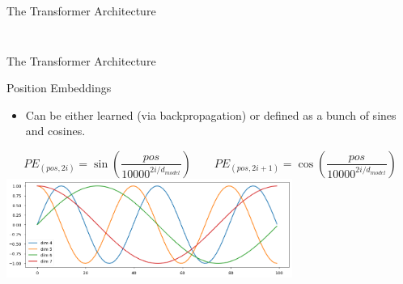 \documentclass[aspectratio=169]{beamer}
\begin{document}
\begin{frame}{The Transformer Architecture}
\begin{columns}
\begin{column}{0.5\textwidth}
\begin{center}
\begin{figure}
\begin{overprint}
    \end{overprint}
    \end{figure}
    \end{center}
\end{column}
\end{columns}
\end{frame}

\begin{frame}{The Transformer Architecture}

\centering
Position Embeddings
\vspace{.2cm}

\raggedright
\begin{itemize}
	\item Can be either learned (via backpropagation) or defined as a bunch of sines and cosines.
\end{itemize}
\vspace{.2cm}

$$
PE_{(pos, 2i)} = \sin \left(\frac{pos}{10000^{2i/d_{model}}} \right) \qquad PE_{(pos, 2i+1)} = \cos \left(\frac{pos}{10000^{2i/d_{model}}} \right)
$$
\vspace{.3cm}
\centering
\includegraphics[width=0.7\textwidth]{figures/pos_encoding_sines}

\end{frame}

\end{document}
